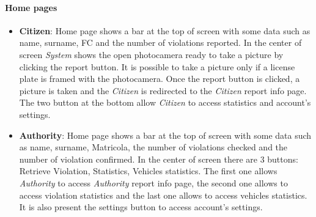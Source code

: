 \documentclass{article}
\begin{document}
\paragraph{Home pages}
\begin{itemize}
    \item \textbf{Citizen}: Home page shows a bar at the top of screen with some data such as name, surname, FC and 
    the number of violations reported. In the center of screen \textit{System} shows the open photocamera ready to take
    a picture by clicking the report button. It is possible to take a picture only if a license plate is framed with the 
    photocamera. Once the report button is clicked, a picture is taken and the \textit{Citizen} is redirected to the 
    \textit{Citizen} report info page. The two button at the bottom allow \textit{Citizen} to access statistics and 
    account's settings.

    \item \textbf{Authority}: Home page shows a bar at the top of screen with some data such as name, surname, Matricola,  
    the number of violations checked and the number of violation confirmed. In the center of screen there are 3 buttons:
    Retrieve Violation, Statistics, Vehicles statistics. The first one allows \textit{Authority} to access \textit{Authority} 
    report info page, the second one allows to access violation statistics and the last one allows to access vehicles 
    statistics. It is also present the settings button to access account's settings.  

\end{itemize}
\end{document}
